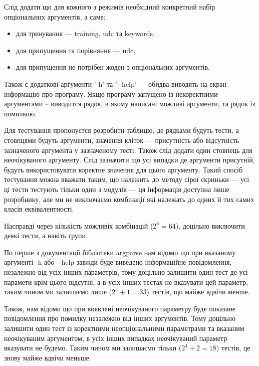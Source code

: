 \documentclass[14pt]{extarticle}
\begin{document}
  \newpage
  Слід додати що для кожного з режимів необхідний конкретний
  набір опціональних аргументів, а саме:
  \begin{itemize}[labelindent=\dimexpr{}\relax, leftmargin=*]
    \item для тренування --- training, udc та keywords,
    \item для припущення та порівняння --- udc,
    \item для припущення не потрібен жоден з опціональних аргументів.
  \end{itemize}

  Також є додаткові аргументи '-h' та '-{}-help' ---
  обидва виводять на екран інформацію про програму.
  Якщо програму запущено із некоректними аргументами -- виводится рядок,
  в якому написані можливі аргументи, та рядок із помилкою.

  Для тестування пропонуєтся розробити таблицю, де рядками будуть тести,
  а стовпцями будуть аргументи, значення кліток ---
  присутність або відсутність зазначеного аргумента у зазначеному тесті.
  Також слід додати один стовпець для неочікуваного аргументу.
  Слід зазначити що усі випадки де аргументи присутній,
  будуть використовувати коректне значення для цього аргументу.
  Такий спосіб тестування можна вважати таким,
  що належить до методу сірої скриньки ---
  усі ці тести тестують тільки один з модулів ---
  ця інформація доступна лише розробнику, але ми не виключаємо комбінації
  які належать до одних й тих самих класів еквівалентності.

  Насправді через кількість можливіх комбінацій ($2^6 = 64$),
  доцільно виключити деякі тести, а навіть групи.

  По перше з документації бібліотеки argparse нам відомо що при вказаному
  аргументі -h або -{}-help завжди буде виведено інформаційне повідомлення,
  незалежно від усіх інших параметрів, тому доцільно залишити
  один тест де усі парамети крім цього відсутні,
  а в усіх інших тестах не вказувати цей параметр,
  таким чином ми залишаємо лише ($2^5 + 1= 33$) тестів, що майже вдвічи менше.

  Також, нам відомо що при виявлені неочікуваного параметру
  буде показане повідомлення про помилку незалежно від інших аргументів.
  Тому доцільно залишити один тест із коректними неопціональними параметрами
  та вказаним неочікуваним аргументом,
  в усіх інших випадках неочікуваний параметр вказувати не будемо.
  Таким чином ми залишаємо тільки ($2^4+2=18$) тестів,
  це знову майже вдвічи меньше.
\end{document}
